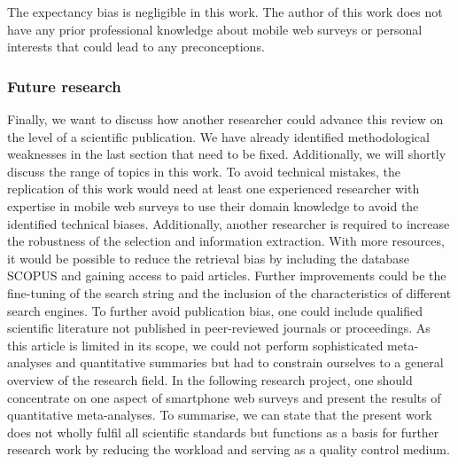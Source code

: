The expectancy bias is negligible in this work. The author of this work does not have any prior professional knowledge about mobile web surveys or personal interests that could lead to any preconceptions.

\subsubsection{Future research}
Finally, we want to discuss how another researcher could advance this review on the level of a scientific publication. We have already identified methodological weaknesses in the last section that need to be fixed. Additionally, we will shortly discuss the range of topics in this work. To avoid technical mistakes, the replication of this work would need at least one experienced researcher with expertise in mobile web surveys to use their domain knowledge to avoid the identified technical biases. Additionally, another researcher is required to increase the robustness of the selection and information extraction. With more resources, it would be possible to reduce the retrieval bias by including the database SCOPUS and gaining access to paid articles. Further improvements could be the fine-tuning of the search string and the inclusion of the characteristics of different search engines. To further avoid publication bias, one could include qualified scientific literature not published in peer-reviewed journals or proceedings. As this article is limited in its scope, we could not perform sophisticated meta-analyses and quantitative summaries but had to constrain ourselves to a general overview of the research field. In the following research project, one should concentrate on one aspect of smartphone web surveys and present the results of quantitative meta-analyses. To summarise, we can state that the present work does not wholly fulfil all scientific standards but functions as a basis for further research work by reducing the workload and serving as a quality control medium. 